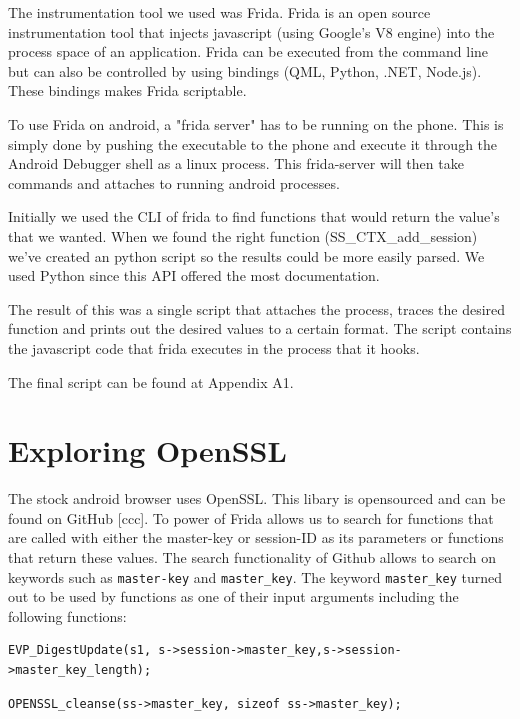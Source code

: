 \documentclass[12pt, a4paper]{report}
\begin{document}
The instrumentation tool we used was Frida. Frida is an open source instrumentation tool that injects javascript (using Google's V8 engine) into the process space of an application. Frida can be executed from the command line but can also be controlled by using bindings (QML, Python, .NET, Node.js). These bindings makes Frida scriptable. 

To use Frida on android, a "frida server" has to be running on the phone. This is simply done by pushing the executable to the phone and execute it through the Android Debugger shell as a linux process. This frida-server will then take commands and attaches to running android processes.

Initially we used the CLI of frida to find functions that would return the value's that we wanted. When we found the right function (SS\_CTX\_add\_session) we’ve created an python script so the results could be more easily parsed. We used Python since this API offered the most documentation. 

The result of this was a single script that attaches the process, traces the desired function and prints out the desired values to a certain format. The script contains the javascript code that frida executes in the process that it hooks.

The final script can be found at Appendix A1.
\clearpage

\section{Exploring OpenSSL}
The stock android browser uses OpenSSL. This libary is opensourced and can be found on GitHub [ccc]. To power of Frida allows us to search for functions that are called with either the master-key or session-ID as its parameters or functions that return these values. The search functionality of Github allows to search on keywords such as \texttt{master-key} and \texttt{master\_key}. The keyword \texttt{master\_key} turned out to be used by functions as one of their input arguments including the following functions:

\begin{lstlisting}[frame=single, breaklines=true]
EVP_DigestUpdate(s1, s->session->master_key,s->session->master_key_length);
\end{lstlisting}

\begin{lstlisting}[frame=single, breaklines=true]
OPENSSL_cleanse(ss->master_key, sizeof ss->master_key);
\end{lstlisting}
\end{document}
